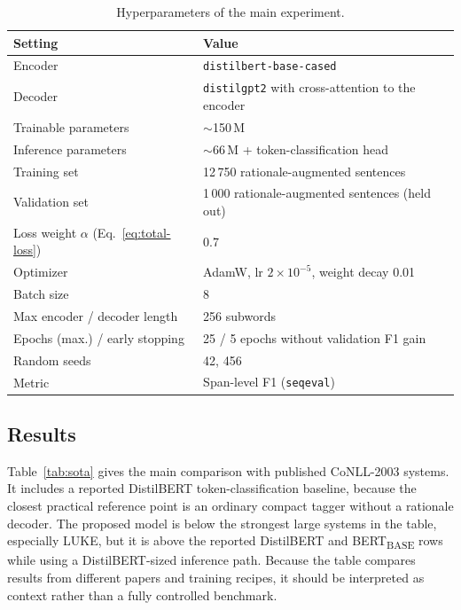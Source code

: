 \documentclass[a4paper,12pt]{extarticle}
\begin{document}
\begin{table}[H]
\centering
\small
\caption{Hyperparameters of the main experiment.}
\label{tab:hyperparams}
\begin{tabularx}{\linewidth}{@{}lX@{}}
\toprule
\textbf{Setting} & \textbf{Value} \\
\midrule
Encoder & \texttt{distilbert-base-cased} \\
Decoder & \texttt{distilgpt2} with cross-attention to the encoder \\
Trainable parameters & $\sim$150\,M \\
Inference parameters & $\sim$66\,M + token-classification head \\
Training set & 12\,750 rationale-augmented sentences \\
Validation set & 1\,000 rationale-augmented sentences (held out) \\
Loss weight $\alpha$ (Eq.~\eqref{eq:total-loss}) & 0.7 \\
Optimizer & AdamW, lr $2\times 10^{-5}$, weight decay 0.01 \\
Batch size & 8 \\
Max encoder / decoder length & 256 subwords \\
Epochs (max.) / early stopping & 25 / 5 epochs without validation F1 gain \\
Random seeds & 42, 456 \\
Metric & Span-level F1 (\texttt{seqeval}) \\
\bottomrule
\end{tabularx}
\end{table}

\subsection{Results}
\label{sec:main-results}

Table~\ref{tab:sota} gives the main comparison with published CoNLL-2003 systems. It includes a reported DistilBERT token-classification baseline, because the closest practical reference point is an ordinary compact tagger without a rationale decoder. The proposed model is below the strongest large systems in the table, especially LUKE, but it is above the reported DistilBERT and BERT\textsubscript{BASE} rows while using a DistilBERT-sized inference path. Because the table compares results from different papers and training recipes, it should be interpreted as context rather than a fully controlled benchmark.
\end{document}
